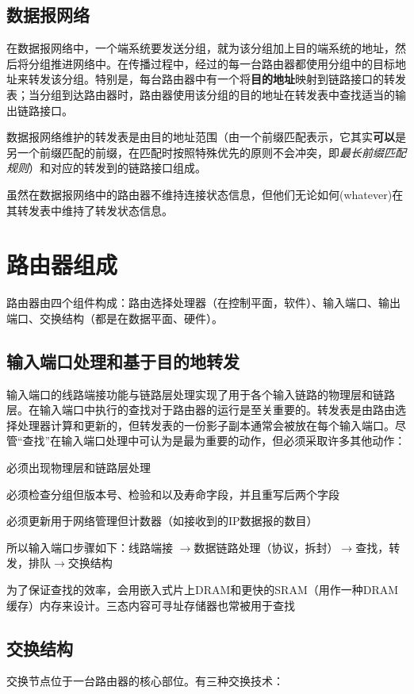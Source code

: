 \documentclass[]{report}
\newcommand*{\circled}[1]{\lower.7ex\hbox{\tikz\draw (0pt, 0pt)%
    circle (.5em) node {\makebox[1em][c]{\small #1}};}} %
\begin{document}
		\subsection{数据报网络}
		在数据报网络中，一个端系统要发送分组，就为该分组加上目的端系统的地址，然后将分组推进网络中。在传播过程中，经过的每一台路由器都使用分组中的目标地址来转发该分组。特别是，每台路由器中有一个将\textbf{目的地址}映射到链路接口的转发表；当分组到达路由器时，路由器使用该分组的目的地址在转发表中查找适当的输出链路接口。\par
		数据报网络维护的转发表是由目的地址范围（由一个前缀匹配表示，它其实\textbf{可以}是另一个前缀匹配的前缀，在匹配时按照特殊优先的原则不会冲突，即\textit{最长前缀匹配规则}）和对应的转发到的链路接口组成。\par
		虽然在数据报网络中的路由器不维持连接状态信息，但他们无论如何(whatever)在其转发表中维持了转发状态信息。
	\section{路由器组成}
	路由器由四个组件构成：路由选择处理器（在控制平面，软件）、输入端口、输出端口、交换结构（都是在数据平面、硬件）。
		\subsection{输入端口处理和基于目的地转发}
		输入端口的线路端接功能与链路层处理实现了用于各个输入链路的物理层和链路层。在输入端口中执行的查找对于路由器的运行是至关重要的。转发表是由路由选择处理器计算和更新的，但转发表的一份影子副本通常会被放在每个输入端口。{\color[HTML]{FF7F50}{使用在每个输入端口的影子副本，转发决策能在每个输入端口本地做出，无需基于每个分组调用集中式路由选择处理器，因此避免了集中式处理的瓶颈。}}尽管“查找”在输入端口处理中可认为是最为重要的动作，但必须采取许多其他动作：
		\begin{enumerate}[label = \circled{\arabic{*}}]
			\item 必须出现物理层和链路层处理
			\item 必须检查分组但版本号、检验和以及寿命字段，并且重写后两个字段
			\item 必须更新用于网络管理但计数器（如接收到的IP数据报的数目）
		\end{enumerate}
		所以输入端口步骤如下：线路端接 $\to$数据链路处理（协议，拆封）$\to$查找，转发，排队$\to$交换结构\par
		为了保证查找的效率，会用嵌入式片上DRAM和更快的SRAM（用作一种DRAM缓存）内存来设计。三态内容可寻址存储器也常被用于查找
		\subsection{交换结构}
		交换节点位于一台路由器的核心部位。有三种交换技术：
\end{document}
